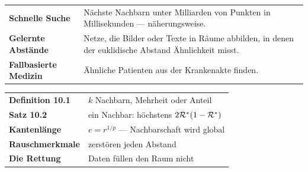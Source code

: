 \begin{forschung}
\begin{center}
{\small
\renewcommand{\arraystretch}{1.45}
\begin{tabular}{@{}P{2.8cm}P{5.4cm}@{}}
\toprule
\textbf{Schnelle Suche} & Nächste Nachbarn unter Milliarden von Punkten in Millisekunden --- näherungsweise.\\
\textbf{Gelernte Abstände} & Netze, die Bilder oder Texte in Räume abbilden, in denen der euklidische Abstand Ähnlichkeit misst.\\
\textbf{Fallbasierte Medizin} & Ähnliche Patienten aus der Krankenakte finden.\\
\bottomrule
\end{tabular}}
\end{center}

\begin{center}
\begin{minipage}{0.88\textwidth}
\end{minipage}
\end{center}
\end{forschung}

\begin{merksatz}
\begin{center}
\renewcommand{\arraystretch}{1.5}
\begin{tabular}{@{}P{3.0cm}P{5.6cm}@{}}
\toprule
\textbf{Definition 10.1} & $k$ Nachbarn, Mehrheit oder Anteil\\
\textbf{Satz 10.2} & ein Nachbar: höchstens $2\mathcal{R}^{*}(1-\mathcal{R}^{*})$\\
\textbf{Kantenlänge} & $e = r^{1/p}$ --- Nachbarschaft wird global\\
\textbf{Rauschmerkmale} & zerstören jeden Abstand\\
\textbf{Die Rettung} & Daten füllen den Raum nicht\\
\bottomrule
\end{tabular}
\end{center}

\begin{center}
\begin{minipage}{0.88\textwidth}
\end{minipage}
\end{center}
\end{merksatz}
